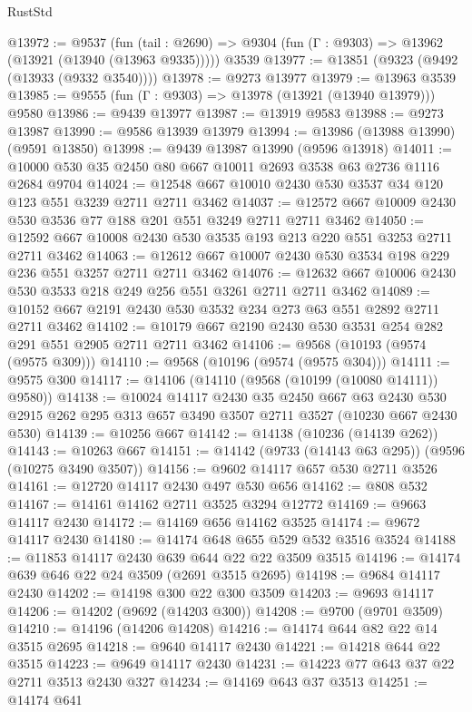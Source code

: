 \begin{lexlean}{RustStd}
\begin{coremodule}
{\begin{coremodule}
{{{{{{{{{{{{{{{{{{{{{{{{{{{{{{{{{{{{{{{{{{{{{{{{{{{{{{{@13972 := @9537
    (fun (tail : @2690) => @9304 (fun (Γ : @9303) => @13962 (@13921 (@13940 (@13963 @9335)))))
    @3539
@13977 := @13851 (@9323 (@9492 (@13933 (@9332 @3540))))
@13978 := @9273 @13977
@13979 := @13963 @3539
@13985 := @9555 (fun (Γ : @9303) => @13978 (@13921 (@13940 @13979))) @9580
@13986 := @9439 @13977
@13987 := @13919 @9583
@13988 := @9273 @13987
@13990 := @9586 @13939 @13979
@13994 := @13986 (@13988 @13990) (@9591 @13850)
@13998 := @9439 @13987 @13990 (@9596 @13918)
@14011 := @10000 @530 @35 @2450 @80 @667 @10011 @2693 @3538 @63 @2736 @1116 @2684 @9704
@14024 := @12548 @667 @10010 @2430 @530 @3537 @34 @120 @123 @551 @3239 @2711 @2711 @3462
@14037 := @12572 @667 @10009 @2430 @530 @3536 @77 @188 @201 @551 @3249 @2711 @2711 @3462
@14050 := @12592 @667 @10008 @2430 @530 @3535 @193 @213 @220 @551 @3253 @2711 @2711 @3462
@14063 := @12612 @667 @10007 @2430 @530 @3534 @198 @229 @236 @551 @3257 @2711 @2711 @3462
@14076 := @12632 @667 @10006 @2430 @530 @3533 @218 @249 @256 @551 @3261 @2711 @2711 @3462
@14089 := @10152 @667 @2191 @2430 @530 @3532 @234 @273 @63 @551 @2892 @2711 @2711 @3462
@14102 := @10179 @667 @2190 @2430 @530 @3531 @254 @282 @291 @551 @2905 @2711 @2711 @3462
@14106 := @9568 (@10193 (@9574 (@9575 @309)))
@14110 := @9568 (@10196 (@9574 (@9575 @304)))
@14111 := @9575 @300
@14117 := @14106 (@14110 (@9568 (@10199 (@10080 @14111)) @9580))
@14138 := @10024
    @14117
    @2430
    @35
    @2450
    @667
    @63
    @2430
    @530
    @2915
    @262
    @295
    @313
    @657
    @3490
    @3507
    @2711
    @3527
    (@10230 @667 @2430 @530)
@14139 := @10256 @667
@14142 := @14138 (@10236 (@14139 @262))
@14143 := @10263 @667
@14151 := @14142 (@9733 (@14143 @63 @295)) (@9596 (@10275 @3490 @3507))
@14156 := @9602 @14117 @657 @530 @2711 @3526
@14161 := @12720 @14117 @2430 @497 @530 @656
@14162 := @808 @532
@14167 := @14161 @14162 @2711 @3525 @3294 @12772
@14169 := @9663 @14117 @2430
@14172 := @14169 @656 @14162 @3525
@14174 := @9672 @14117 @2430
@14180 := @14174 @648 @655 @529 @532 @3516 @3524
@14188 := @11853 @14117 @2430 @639 @644 @22 @22 @3509 @3515
@14196 := @14174 @639 @646 @22 @24 @3509 (@2691 @3515 @2695)
@14198 := @9684 @14117 @2430
@14202 := @14198 @300 @22 @300 @3509
@14203 := @9693 @14117
@14206 := @14202 (@9692 (@14203 @300))
@14208 := @9700 (@9701 @3509)
@14210 := @14196 (@14206 @14208)
@14216 := @14174 @644 @82 @22 @14 @3515 @2695
@14218 := @9640 @14117 @2430
@14221 := @14218 @644 @22 @3515
@14223 := @9649 @14117 @2430
@14231 := @14223 @77 @643 @37 @22 @2711 @3513 @2430 @327
@14234 := @14169 @643 @37 @3513
@14251 := @14174
    @641
}}}}}}}}}}}}}}}}}}}}}}}}}}}}}}}}}}}}}}}}}}}}}}}}}}}}}}}
\end{coremodule}}
\end{coremodule}
\end{lexlean}
